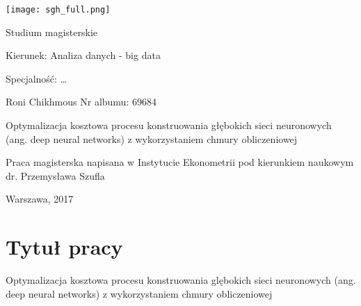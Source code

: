 \documentclass[12pt,a4paper,twoside]{article}
\begin{document}
\begin{center}

  \texttt{[image: sgh\_full.png]}

  \vspace{1cm}
  Studium magisterskie

\end{center}

\vspace{1cm}

\noindent Kierunek: Analiza danych - big data

\noindent Specjalność: \dots

\vspace{1cm}

{
\leftskip=10cm\noindent
Roni Chikhmous\newline
Nr albumu: 69684

}

\vspace{2cm}

\begin{center}
  \LARGE
  Optymalizacja kosztowa procesu konstruowania głębokich sieci neuronowych (ang. deep neural networks) z wykorzystaniem chmury obliczeniowej
\end{center}

\vspace{1cm}

{
\leftskip=10cm\noindent
Praca magisterska napisana\newline
w Instytucie Ekonometrii\newline
pod kierunkiem naukowym\newline
dr. Przemysława Szufla

}

\vfill

\begin{center}
Warszawa, 2017
\end{center}
\thispagestyle{empty}

\clearpage
\thispagestyle{empty}
\mbox{}

\clearpage

\tableofcontents

\clearpage

\section{Tytuł pracy}

Optymalizacja kosztowa procesu konstruowania glębokich sieci neuronowych (ang. deep neural networks) z wykorzystaniem chmury obliczeniowej
\end{document}
